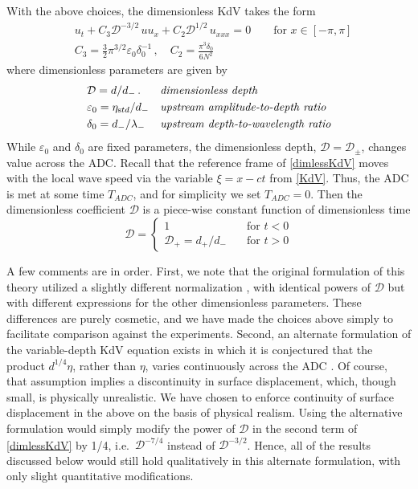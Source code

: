 \documentclass[11pt]{article}
\newcommand{\eps}{\varepsilon}
\newcommand{\etastd}{\eta_{\text std}}
\newcommand{\depth}{d}
\newcommand{\dup}{\depth_{-}}
\newcommand{\ddn}{\depth_{+}}
\newcommand{\lam}{\lambda}
\newcommand{\lamup}{\lam_{-}}
\newcommand{\lamfac}{N}
\newcommand{\drat}{\mathcal{D}}
\newcommand{\dratdn}{\drat_+}
\newcommand{\dratupdn}{\drat_{\pm}}
\newcommand{\epsup}{\eps_0}
\newcommand{\delup}{\delta_0}
\begin{document}
With the above choices, the dimensionless KdV takes the form
\begin{align}
\label{dimlessKdV}
&u_t + C_3 \drat^{-3/2} \, u u_x + C_2 \drat^{1/2} \, u_{xxx} = 0
\qquad \text{for } x \in [-\pi,\pi] \\
&C_3 = \frac{3}{2} \pi^{3/2} \epsup \delup^{-1} \, , \quad
C_2 = \frac{\pi^3 \delup}{6 \lamfac^2} 
\end{align}
where dimensionless parameters are given by
\begin{align}
&\drat = {\depth}/{\dup} \, .
&&\mbox{\em dimensionless depth} \\
&\epsup = \etastd / \dup
&&\mbox{\em upstream amplitude-to-depth ratio} \\
&\delup = \dup / \lamup
&&\mbox{\em upstream depth-to-wavelength ratio}
\end{align}
While $\epsup$ and $\delup$ are fixed parameters, the dimensionless depth, $\drat = \dratupdn$, changes value across the ADC. Recall that the reference frame of \eqref{dimlessKdV} moves with the local wave speed via the variable $\xi = x-ct$ from \eqref{KdV}. Thus, the ADC is met at some time $T_{ADC}$, and for simplicity we set $T_{ADC} = 0$. Then the dimensionless coefficient $\drat$ is a piece-wise constant function of dimensionless time
\begin{equation}
\drat = 
\begin{cases}
1 		&\quad \mbox{for } {t}<0 \\
\dratdn = {\ddn}/{\dup} 	&\quad \mbox{for } {t}>0
\end{cases}
\end{equation}

A few comments are in order. First, we note that the original formulation of this theory utilized a slightly different normalization \cite{majda2019statistical}, with identical powers of $\drat$ but with different expressions for the other dimensionless parameters. These differences are purely cosmetic, and we have made the choices above simply to facilitate comparison against the experiments. Second, an alternate formulation of the variable-depth KdV equation exists in which it is conjectured that the product $\depth^{1/4} \eta$, rather than $\eta$, varies continuously across the ADC \cite{johnson1997modern}. Of course, that assumption implies a discontinuity in surface displacement, which, though small, is physically unrealistic. We have chosen to enforce continuity of surface displacement in the above on the basis of physical realism. Using the alternative formulation would simply modify the power of $\drat$ in the second term of \eqref{dimlessKdV} by 1/4, i.e.~$\drat^{-7/4}$ instead of $\drat^{-3/2}$. Hence, all of the results discussed below would still hold qualitatively in this alternate formulation, with only slight quantitative modifications.
\end{document}
